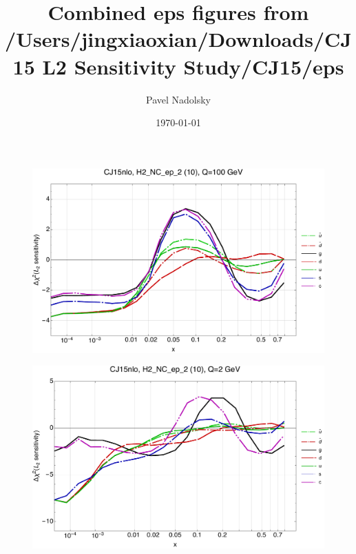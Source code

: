 \documentclass[10pt,aps,prd,floatfix,titlepage]{revtex4}
\begin{document}
\title{Combined eps figures from /Users/jingxiaoxian/Downloads/CJ15 L2 Sensitivity Study/CJ15/eps}
\date{\today}
\author{Pavel Nadolsky}
\maketitle
\begin{figure}
\includegraphics[width=\textwidth,height=0.44\textheight,keepaspectratio]{1/10_CJ15nlo_L2_q100_Sf_1.pdf}
\caption{}
\end{figure}
\begin{figure}
\includegraphics[width=\textwidth,height=0.44\textheight,keepaspectratio]{1/10_CJ15nlo_L2_q2_Sf_1.pdf}
\caption{}
\end{figure}
\clearpage
\end{document}
